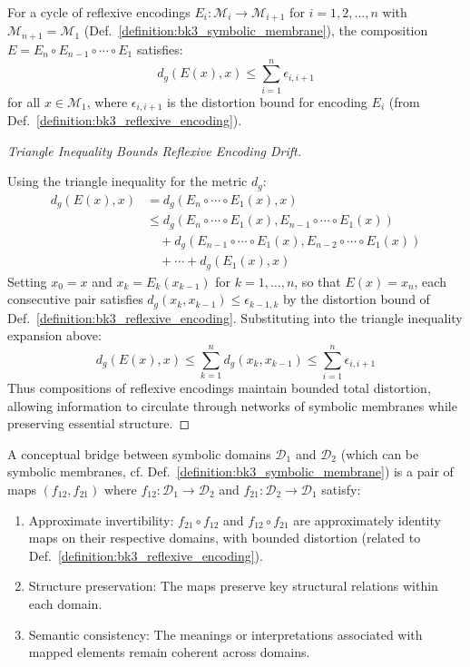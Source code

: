 \begin{theorem} \label{theorem:bk3_cyclic_reflexive_encodings}
For a cycle of reflexive encodings $E_i: \mathcal{M}_i \rightarrow \mathcal{M}_{i+1}$ for $i = 1,2,...,n$ with $\mathcal{M}_{n+1} = \mathcal{M}_1$ (Def.~\ref{definition:bk3_symbolic_membrane}), the composition $E = E_n \circ E_{n-1} \circ \cdots \circ E_1$ satisfies:
\[
d_g(E(x), x) \leq \sum_{i=1}^{n} \epsilon_{i,i+1}
\]
for all $x \in \mathcal{M}_1$, where $\epsilon_{i,i+1}$ is the distortion bound for encoding $E_i$ (from Def.~\ref{definition:bk3_reflexive_encoding}).
\end{theorem}

\begin{proof}[Triangle Inequality Bounds Reflexive Encoding Drift]
\label{proof:bk3_triangle_inequality_encoding_bound}
\leavevmode

Using the triangle inequality for the metric $d_g$:
\begin{align*}
d_g(E(x), x) &= d_g(E_n \circ \cdots \circ E_1(x), x) \\
&\leq d_g(E_n \circ \cdots \circ E_1(x), E_{n-1} \circ \cdots \circ E_1(x)) \\
&\quad + d_g(E_{n-1} \circ \cdots \circ E_1(x), E_{n-2} \circ \cdots \circ E_1(x)) \\
&\quad + \cdots + d_g(E_1(x), x)
\end{align*}
Setting $x_0 = x$ and $x_k = E_k(x_{k-1})$ for $k = 1, \ldots, n$, so that $E(x) = x_n$, each consecutive pair satisfies $d_g(x_k, x_{k-1}) \leq \epsilon_{k-1, k}$ by the distortion bound of Def.~\ref{definition:bk3_reflexive_encoding}. Substituting into the triangle inequality expansion above:
\[
d_g(E(x), x) \leq \sum_{k=1}^{n} d_g(x_k, x_{k-1}) \leq \sum_{i=1}^{n} \epsilon_{i,i+1}
\]
Thus compositions of reflexive encodings maintain bounded total distortion, allowing information to circulate through networks of symbolic membranes while preserving essential structure.
\end{proof}

\begin{definition} \label{definition:bk3_conceptual_bridge}
A conceptual bridge between symbolic domains $\mathcal{D}_1$ and $\mathcal{D}_2$ (which can be symbolic membranes, cf. Def.~\ref{definition:bk3_symbolic_membrane}) is a pair of maps $(f_{12}, f_{21})$ where $f_{12}: \mathcal{D}_1 \rightarrow \mathcal{D}_2$ and $f_{21}: \mathcal{D}_2 \rightarrow \mathcal{D}_1$ satisfy:
\begin{enumerate}
    \item Approximate invertibility: $f_{21} \circ f_{12}$ and $f_{12} \circ f_{21}$ are approximately identity maps on their respective domains, with bounded distortion (related to Def.~\ref{definition:bk3_reflexive_encoding}).
    \item Structure preservation: The maps preserve key structural relations within each domain.
    \item Semantic consistency: The meanings or interpretations associated with mapped elements remain coherent across domains.
\end{enumerate}
\end{definition}

